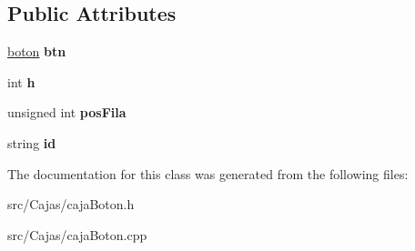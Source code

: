 \subsection*{Public Attributes}
\begin{DoxyCompactItemize}
\item 
\hypertarget{classcaja_boton_a67f70e9feed641b60d25ae1dc1ecdf8c}{}\hyperlink{classboton}{boton} {\bfseries btn}\label{classcaja_boton_a67f70e9feed641b60d25ae1dc1ecdf8c}

\item 
\hypertarget{classcaja_boton_ad8c5f144b388b71a27c6f0692fe40da7}{}int {\bfseries h}\label{classcaja_boton_ad8c5f144b388b71a27c6f0692fe40da7}

\item 
\hypertarget{classcaja_boton_aa8688048b1688c0076235424d3c7b625}{}unsigned int {\bfseries pos\+Fila}\label{classcaja_boton_aa8688048b1688c0076235424d3c7b625}

\item 
\hypertarget{classcaja_boton_a31225c139dfe4c239b35fcd5ef099d03}{}string {\bfseries id}\label{classcaja_boton_a31225c139dfe4c239b35fcd5ef099d03}

\end{DoxyCompactItemize}


The documentation for this class was generated from the following files\+:\begin{DoxyCompactItemize}
\item 
src/\+Cajas/caja\+Boton.\+h\item 
src/\+Cajas/caja\+Boton.\+cpp\end{DoxyCompactItemize}
